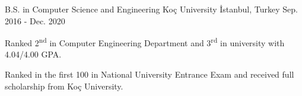 
\vspace*{-1.5mm}

\begin{cventries}
 \cventry
    {B.S. in Computer Science and Engineering}
    {Koç University}
    {İstanbul, Turkey}
    {Sep. 2016 - Dec. 2020}
    {
      \begin{cvitems}
	      \item {Ranked 2\textsuperscript{nd} in Computer Engineering Department and 3\textsuperscript{rd} in university with 4.04/4.00 GPA.}
        \item {Ranked in the first 100 in National University Entrance Exam and received full scholarship from Koç University.}
      \end{cvitems}
    }
\end{cventries}
